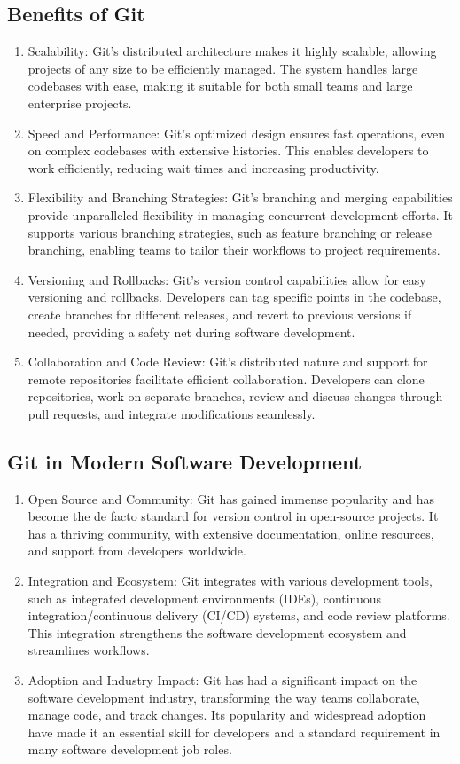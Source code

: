 \subsection*{Benefits of Git}
\begin{enumerate}
    \item Scalability: Git's distributed architecture makes it highly scalable, allowing projects of any size to be efficiently managed. The system handles large codebases with ease, making it suitable for both small teams and large enterprise projects.
    \item Speed and Performance: Git's optimized design ensures fast operations, even on complex codebases with extensive histories. This enables developers to work efficiently, reducing wait times and increasing productivity.
    \item Flexibility and Branching Strategies: Git's branching and merging capabilities provide unparalleled flexibility in managing concurrent development efforts. It supports various branching strategies, such as feature branching or release branching, enabling teams to tailor their workflows to project requirements.
    \item Versioning and Rollbacks: Git's version control capabilities allow for easy versioning and rollbacks. Developers can tag specific points in the codebase, create branches for different releases, and revert to previous versions if needed, providing a safety net during software development.
    \item Collaboration and Code Review: Git's distributed nature and support for remote repositories facilitate efficient collaboration. Developers can clone repositories, work on separate branches, review and discuss changes through pull requests, and integrate modifications seamlessly.
\end{enumerate}

\subsection*{Git in Modern Software Development}
\begin{enumerate}
    \item Open Source and Community: Git has gained immense popularity and has become the de facto standard for version control in open-source projects. It has a thriving community, with extensive documentation, online resources, and support from developers worldwide.
    \item Integration and Ecosystem: Git integrates with various development tools, such as integrated development environments (IDEs), continuous integration/continuous delivery (CI/CD) systems, and code review platforms. This integration strengthens the software development ecosystem and streamlines workflows.
    \item Adoption and Industry Impact: Git has had a significant impact on the software development industry, transforming the way teams collaborate, manage code, and track changes. Its popularity and widespread adoption have made it an essential skill for developers and a standard requirement in many software development job roles.
\end{enumerate}

